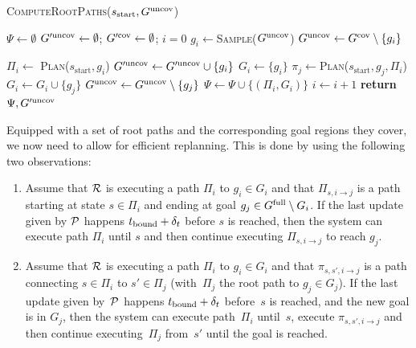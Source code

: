 \documentclass[conference]{IEEEtran}
\begin{document}
\begin{algorithm}[t]
\caption{\textsc{ComputeRootPaths}($s_{\textrm{start}}, G^{\textrm{uncov}}$)}
\label{alg:step1}
\begin{algorithmic}[1]
\State $\Psi \leftarrow \emptyset$   
\State $G'^{\textrm{uncov}} \leftarrow \emptyset$; \hspace{3mm}
       $G'^{\textrm{cov}} \leftarrow \emptyset$; \hspace{3mm}
       $i = 0$
\While{$\Guncov \neq \emptyset$}
    \State $g_i \leftarrow$\textsc{Sample}($G^{\textrm{uncov}}$)
    \State $G^{\textrm{uncov}} \leftarrow G^{\textrm{cov}} \setminus \{g_i\}$
    
    \State $\Pi_i \leftarrow$ \textsc{Plan}($s_{\textrm{start}}, g_i$)
      
        \State $G'^{\textrm{uncov}} \leftarrow G'^{\textrm{uncov}} \cup \{g_i\}$
    \Else
        \State $G_i \leftarrow \{ g_i \}$
            \State $\pi_j \leftarrow$\textsc{Plan}($s_{\textrm{start}},g_j,\Pi_i$)
             
                \State $G_i \leftarrow G_i \cup \{g_j\}$
                \State $G^{\textrm{uncov}} \leftarrow G^{\textrm{uncov}} \setminus \{g_j\}$
            \EndIf
        \EndFor
        \State $\Psi \leftarrow \Psi \cup \{ (\Pi_i, G_i)\}$
        \State $i \leftarrow i + 1$
    \EndIf
\EndWhile
\State \textbf{return} $\Psi, G'^{\textrm{uncov}}$
\end{algorithmic}
\end{algorithm}

Equipped with a set of root paths and the corresponding goal regions they cover, we now need to allow for efficient replanning. This is done by using the following two observations:
\begin{enumerate}[label={\textbf{O\arabic*}},leftmargin=0.75cm]
    \item \label{obs:1} 
    Assume that $\mathcal{R}$ is executing a path $\Pi_i$ to $g_i \in G_i$ and that $\Pi_{s, i \rightarrow j}$ is a path starting at state $s \in \Pi_i$ and ending at goal $g_j \in G^{\textrm{full}} \setminus G_i$.
    If the last update given by $\mathcal{P}$ happens $t_{\textrm{bound}} + \delta_t$ before $s$ is reached,
    then the system can execute path $\Pi_i$ until $s$ and then continue executing $\Pi_{s, i \rightarrow j}$ to reach  $g_j$.

    \item \label{obs:2} 
    Assume that $\mathcal{R}$ is executing a path $\Pi_i$ to $g_i \in G_i$ and that $\pi_{s,s',i \rightarrow j}$ is a path connecting  $s \in \Pi_i$ to $s' \in \Pi_j$ (with~$\Pi_j$ the root path to $g_j \in G_j$).
    If the last update given by~$\mathcal{P}$ happens $t_{\textrm{bound}} + \delta_t$ before~$s$ is reached,
    and the new goal is in $G_j$,
    then the system can execute path~$\Pi_i$ until~$s$, execute $\pi_{s,s',i \rightarrow j}$ and then continue executing~$\Pi_{j}$ from~$s'$ until the goal is reached.

\end{enumerate}
\end{document}
